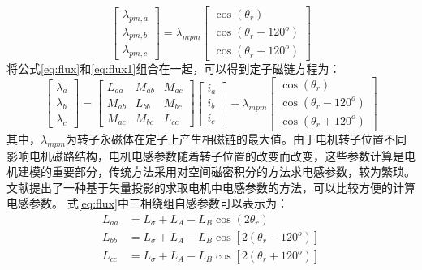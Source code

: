 \begin{equation}\label{eq:flux1}
\begin{bmatrix}\lambda_{pm,a}\\\lambda_{pm,b}\\\lambda_{pm,c}\end{bmatrix}
=
\lambda_{mpm}\begin{bmatrix}\cos(\theta_{r})\\\cos(\theta_{r}-120^{o})\\\cos(\theta_{r}+120^{o})\end{bmatrix} 
\end{equation}
将公式\ref{eq:flux}和\ref{eq:flux1}组合在一起，可以得到定子磁链方程为：
\begin{equation}\label{eq:flux2}
\begin{bmatrix}
\lambda_{a}\\\lambda_{b}\\\lambda_{c}
\end{bmatrix}
=
\begin{bmatrix}
L_{aa}&M_{ab}&M_{ac}\\M_{ab}&L_{bb}&M_{bc}\\M_{ac}&M_{bc}&L_{cc}
\end{bmatrix}
\begin{bmatrix}
i_{a}\\i_{b}\\i_{c}
\end{bmatrix}
+
\lambda_{mpm}\begin{bmatrix}\cos(\theta_{r})\\\cos(\theta_{r}-120^{o})\\\cos(\theta_{r}+120^{o})\end{bmatrix}
\end{equation}
其中，$\lambda_{mpm}$为转子永磁体在定子上产生相磁链的最大值。由于电机转子位置不同影响电机磁路结构，电机电感参数随着转子位置的改变而改变，这些参数计算是电机建模的重要部分，传统方法采用对空间磁密积分的方法求电感参数，较为繁琐。文献提出了一种基于矢量投影的求取电机中电感参数的方法，可以比较方便的计算电感参数。
式\ref{eq:flux}中三相绕组自感参数可以表示为：
\begin{align}
L_{aa}&= L_{\sigma}+L_{A}-L_{B}\cos(2\theta_{r})\label{eq:Laa}\\
L_{bb}&= L_{\sigma}+L_{A}-L_{B}\cos[2(\theta_{r}-120^{o})]\label{eq:Lbb}\\ 
L_{cc}&= L_{\sigma}+L_{A}-L_{B}\cos[2(\theta_{r}+120^{o})]\label{eq:Lcc}
\end{align}
